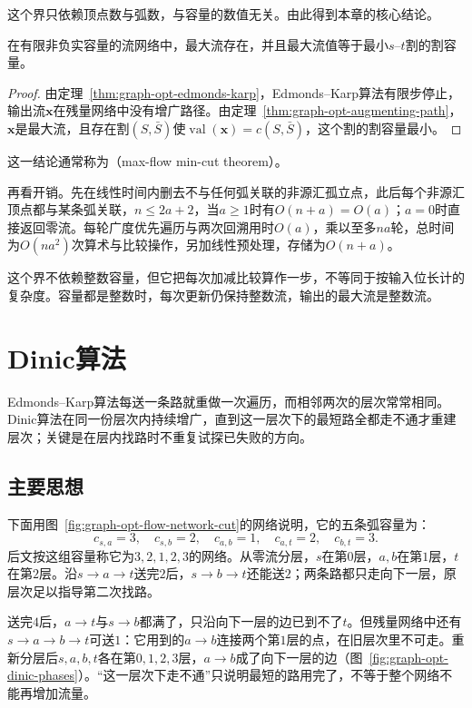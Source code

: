 这个界只依赖顶点数与弧数，与容量的数值无关。由此得到本章的核心结论。

\begin{theorem}[最大流最小割定理]
\label{thm:graph-opt-max-flow-min-cut}
在有限非负实容量的流网络中，最大流存在，并且最大流值等于最小$s$--$t$割的割容量。
\end{theorem}

\begin{proof}
由定理~\ref{thm:graph-opt-edmonds-karp}，Edmonds--Karp算法有限步停止，输出流$\bm x$在残量网络中没有增广路径。由定理~\ref{thm:graph-opt-augmenting-path}，$\bm x$是最大流，且存在割$(S,\bar S)$使$\operatorname{val}(\bm x)=c(S,\bar S)$，这个割的割容量最小。
\end{proof}

这一结论通常称为（max-flow min-cut theorem）。

再看开销。先在线性时间内删去不与任何弧关联的非源汇孤立点，此后每个非源汇顶点都与某条弧关联，$n\leq2a+2$，当$a\geq1$时有$O(n+a)=O(a)$；$a=0$时直接返回零流。每轮广度优先遍历与两次回溯用时$O(a)$，乘以至多$na$轮，总时间为$O(na^2)$次算术与比较操作，另加线性预处理，存储为$O(n+a)$。

这个界不依赖整数容量，但它把每次加减比较算作一步，不等同于按输入位长计的复杂度。容量都是整数时，每次更新仍保持整数流，输出的最大流是整数流。

\section{Dinic算法}
\label{sec:graph-opt-dinic}

Edmonds--Karp算法每送一条路就重做一次遍历，而相邻两次的层次常常相同。Dinic算法在同一份层次内持续增广，直到这一层次下的最短路全都走不通才重建层次；关键是在层内找路时不重复试探已失败的方向。

\subsection{主要思想}

下面用图~\ref{fig:graph-opt-flow-network-cut}的网络说明，它的五条弧容量为：
\[
  c_{s,a}=3,\quad c_{s,b}=2,\quad c_{a,b}=1,\quad c_{a,t}=2,\quad c_{b,t}=3.
\]
后文按这组容量称它为$3,2,1,2,3$的网络。从零流分层，$s$在第$0$层，$a,b$在第$1$层，$t$在第$2$层。沿$s\to a\to t$送完$2$后，$s\to b\to t$还能送$2$；两条路都只走向下一层，原层次足以指导第二次找路。

送完$4$后，$a\to t$与$s\to b$都满了，只沿向下一层的边已到不了$t$。但残量网络中还有$s\to a\to b\to t$可送$1$：它用到的$a\to b$连接两个第$1$层的点，在旧层次里不可走。重新分层后$s,a,b,t$各在第$0,1,2,3$层，$a\to b$成了向下一层的边（图~\ref{fig:graph-opt-dinic-phases}）。“这一层次下走不通”只说明最短的路用完了，不等于整个网络不能再增加流量。

